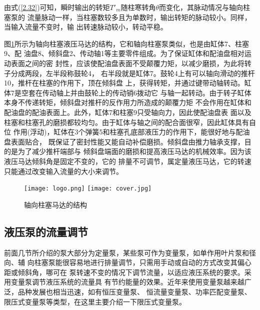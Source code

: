 由式(\ref{2.32})可知，瞬时输出的转矩$T'_{m}$随柱寒转角$\theta $而变化，其脉动情况与轴向柱塞泵的
流量脉动一样，当柱塞数较多且为单数时，输出转矩的脉动较小。同样，当输入流量不变时，输
出转速脉动较小，转动平稳。

图\ref{fig0221}所示为轴向柱塞液压马达的结构，它和轴向柱塞泵类似，也是由缸体7、柱塞9、配
油盘8、倾斜盘2、传动轴1等主要零件组成。为了保证缸体和配油盘相对运动表面之间的密
封性，应该使配油盘表面不受颠覆力矩，以减少磨损，为此将转子分成两段，左半段称鼓轮4，
右半段就是缸体7。鼓轮4上有可以轴向滑动的推杆10，推杆在柱塞的作用下，顶在倾斜盘
上，获得转矩，并通过键带动轴转动。缸体7是空套在传动轴上并由鼓轮上的传动销6拨动它
与轴一起转动。由于转子缸体本身不传递转矩，倾斜盘对推杆的反作用力所造成的颠覆力矩
不会作用在缸体和配油盘的配油表面上。此外，缸体7和柱塞9只受轴向力，因此使配油盘表
面以及柱塞和柱塞孔的磨损都较均匀。由于缸体与轴之间的配合面很窄，因此缸体具有自位
作用(浮动)，缸体在3个弹簧5和柱塞孔底部液压力的作用下，能很好地与配油盘表面贴合，
既保证了密封性能又能自动补偿磨损。倾斜盘由推力轴承支撑，目的是为了减少推杆端部与
倾斜盘端面的磨损和提高液压马达的机械效率。因为该液压马达倾斜角是固定不变的，它的
排量不可调节，属定量液压马达，它的转速只能通过改变输入流量的大小来调节。

\begin{figure}[!htb]\centering
    \ifOpenSource
    \texttt{[image: logo.png]}
    \else
    \texttt{[image: cover.jpg]}
    \fi
    \caption{轴向柱塞马达的结构}
    \label{fig0221}
\end{figure}

\subsection{液压泵的流量调节}

前面几节所介绍的泵大部分为定量泵，某些泵可作为变量泵，如单作用叶片泵和径向、辅
向柱塞泵能很容易地进行排量调节，只需用手动或自动的方式改变其偏心距或倾斜角，哪可在
泵转速不变的情况下调节流量，以适应液压系统的要求。采用变量泵调节液压系统的流量具
有节约能量的效果。近年来使用变量泵越来越广泛，品种发展也相当迅速，如有恒压变量泵、
恒流量变量泵、功率匹配变量泵、限压式变量泵等类型，在这里主要介绍一下限压式变量泵。